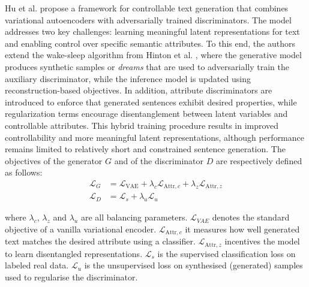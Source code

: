 \documentclass[Main.tex]{subfiles}
\begin{document}
Hu et al. \cite{hu_toward_2018} propose a framework for controllable text generation that combines variational autoencoders with adversarially trained discriminators. The model addresses two key challenges: learning meaningful latent representations for text and enabling control over specific semantic attributes. To this end, the authors extend the wake-sleep algorithm from Hinton et al. \cite{hinton_wake-sleep_1995}, where the generative model produces synthetic samples or \textit{dreams} that are used to adversarially train the auxiliary discriminator, while the inference model is updated using reconstruction-based objectives. In addition, attribute discriminators are introduced to enforce that generated sentences exhibit desired properties, while regularization terms encourage disentanglement between latent variables and controllable attributes. This hybrid training procedure results in improved controllability and more meaningful latent representations, although performance remains limited to relatively short and constrained sentence generation. The objectives of the generator $G$ and of the discriminator $D$ are respectively defined as follows:
\begin{align}
\mathcal{L}_G &= \mathcal{L}_{\text{VAE}} + \lambda_c \mathcal{L}_{\text{Attr},c} + \lambda_z \mathcal{L}_{\text{Attr},z} \\
\mathcal{L}_D &= \mathcal{L}_s + \lambda_u \mathcal{L}_u
\end{align}

where $\lambda_c$, $\lambda_z$ and $\lambda_u$ are all balancing parameters. $\mathcal{L}_{VAE}$ denotes the standard objective of a vanilla variational encoder. $\mathcal{L}_{\text{Attr},c}$ it measures how well generated text matches the desired attribute using a classifier. $\mathcal{L}_{\text{Attr},z}$ incentives the model to learn disentangled representations. $\mathcal{L}_s$ is the supervised classification loss on labeled real data. $\mathcal{L}_u$ is the unsupervised loss on synthesised (generated) samples used to regularise the discriminator.


\end{document}
